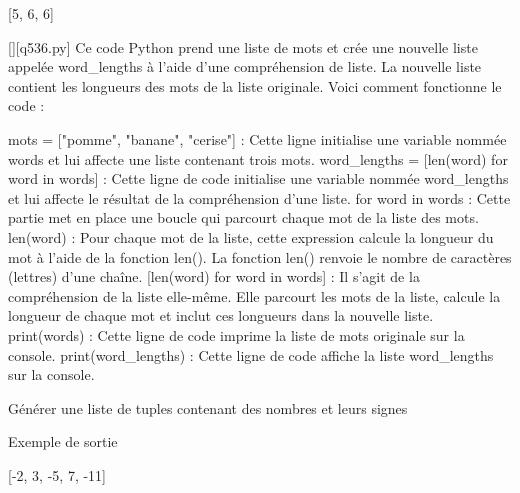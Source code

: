 [5, 6, 6]
        \par
        \begin{solution}
            \renewcommand{\nomfichier}{q536.py}
            \pythonfile{\chemincode \nomfichier}[][\nomfichier]
            Ce code Python prend une liste de mots et crée une nouvelle liste appelée word\_lengths à l'aide d'une compréhension de liste. La nouvelle liste contient les longueurs des mots de la liste originale. Voici comment fonctionne le code :

    mots = ["pomme", "banane", "cerise"] : Cette ligne initialise une variable nommée words et lui affecte une liste contenant trois mots.
    word\_lengths = [len(word) for word in words] : Cette ligne de code initialise une variable nommée word\_lengths et lui affecte le résultat de la compréhension d'une liste.
        for word in words : Cette partie met en place une boucle qui parcourt chaque mot de la liste des mots.
        len(word) : Pour chaque mot de la liste, cette expression calcule la longueur du mot à l'aide de la fonction len(). La fonction len() renvoie le nombre de caractères (lettres) d'une chaîne.
        [len(word) for word in words] : Il s'agit de la compréhension de la liste elle-même. Elle parcourt les mots de la liste, calcule la longueur de chaque mot et inclut ces longueurs dans la nouvelle liste.
    print(words) : Cette ligne de code imprime la liste de mots originale sur la console.
    print(word\_lengths) : Cette ligne de code affiche la liste word\_lengths sur la console.
        \end{solution}
        

        \question
        Générer une liste de tuples contenant des nombres et leurs signes

Exemple de sortie

[-2, 3, -5, 7, -11]

